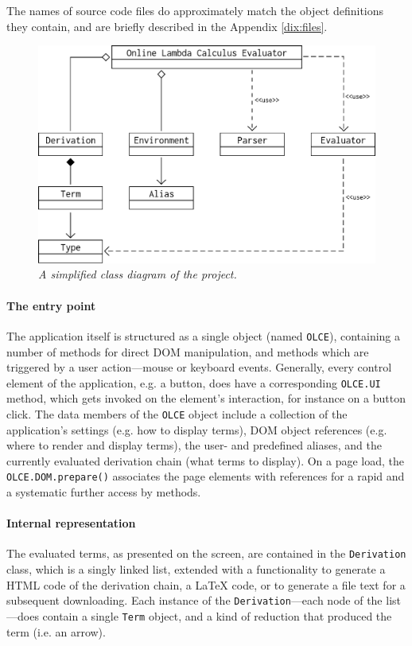 \documentclass[table, a4paper, 10pt]{book}
\begin{document}
The names of source code files do approximately match the object definitions they contain,
and are briefly described in the Appendix \ref{dix:files}.

\begin{figure}[H]\centering
\includegraphics[scale=0.33]{simpleUMLpdf.pdf}
\caption{\textit{A simplified class diagram of the project.}}\label{uml}
\end{figure}

\paragraph{The entry point}
The application itself is structured as a single object (named \texttt{OLCE}), containing
a number of methods for direct DOM manipulation, and methods which are
triggered by a user action---mouse or keyboard events.
Generally, every control element of the application, e.g. a button, does have a corresponding
\texttt{OLCE.UI} method, which gets invoked on the element's interaction, for instance on a button click.
The data members of the \texttt{OLCE} object include a collection of the application's
settings (e.g. how to display terms), DOM object references (e.g. where to render and display terms),
the user- and predefined aliases, and the currently evaluated
derivation chain (what terms to display). On a page load, the \texttt{OLCE.DOM.prepare()} associates
the page elements with references for a rapid and a systematic further access by methods.

\paragraph{Internal representation}
The evaluated terms, as presented on the screen, are contained in
the \texttt{Derivation} class, which is a singly linked list,
extended with a functionality to generate a HTML code of the derivation chain,
a \LaTeX\; code, or to generate a file text for a subsequent downloading.
Each instance of the \texttt{Derivation}---each node of the list---does contain
a single \texttt{Term} object, and a kind of reduction that produced the term (i.e. an arrow).
\end{document}
